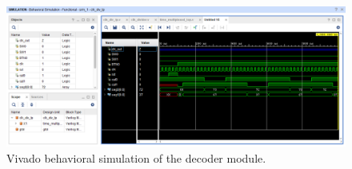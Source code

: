 \begin{figure}[H]
	\centering
	\includegraphics[width=1.0\textwidth ]{01_images/Vivado_lab2_sim_time_multi_module.PNG}
	\caption{Vivado behavioral simulation of the decoder module.}
	\label{fig: Vivado_lab2_sim_time_multi_module}
\end{figure}
